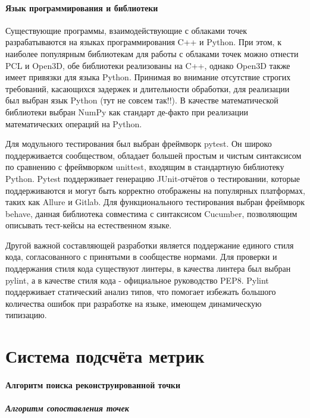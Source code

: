 \subsubsection{Язык программирования и библиотеки}

Существующие программы, взаимодействующие с облаками точек разрабатываются на
языках программирования C++ и Python. При этом, к наиболее популярным
библиотекам для работы с облаками точек можно отнести PCL и Open3D, обе
библиотеки реализованы на C++, однако Open3D также имеет привязки для языка
Python. Принимая во внимание отсутствие строгих требований, касающихся задержек
и длительности обработки, для реализации был выбран язык Python (тут не совсем
так!!). В качестве математической библиотеки выбран NumPy как стандарт де-факто
при реализации математических операций на Python.

Для модульного тестирования был выбран фреймворк pytest. Он широко
поддерживается сообществом, обладает большей простым и чистым синтаксисом по
сравнению с фреймворком unittest, входящим в стандартную библиотеку Python.
Pytest поддерживает генерацию JUnit-отчётов о тестировании, которые
поддерживаются и могут быть корректно отображены на популярных платформах, таких
как Allure и Gitlab. Для функционального тестирования выбран фреймворк behave,
данная библиотека совместима с синтаксисом Cucumber, позволяющим описывать
тест-кейсы на естественном языке.

Другой важной составляющей разработки является поддержание единого стиля кода,
согласованного с принятыми в сообществе нормами. Для проверки и поддержания
стиля кода существуют линтеры, в качества линтера был выбран pylint, а в
качестве стиля кода - официальное руководство PEP8. Pylint поддерживает
статический анализ типов, что помогает избежать большого количества ошибок при
разработке на языке, имеющем динамическую типизацию.

\chapter{Система подсчёта метрик}

\subsubsection{Алгоритм поиска реконструированной точки}

\paragraph{Алгоритм сопоставления точек}

